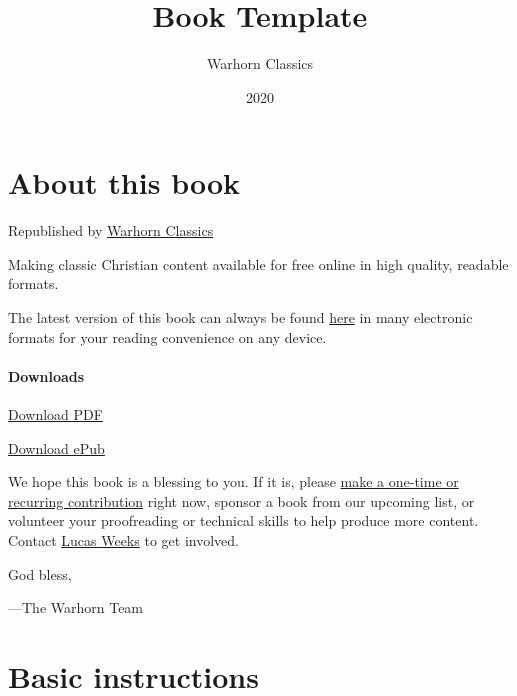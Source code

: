 \documentclass[
]{book}
\title{Book Template}
\author{Warhorn Classics}
\date{2020}
\begin{document}
\maketitle

\mainmatter
{}

{
\setcounter{tocdepth}{1}
\tableofcontents
}
\hypertarget{about-this-book}{%
\chapter*{About this book}\label{about-this-book}}

Republished by \href{https://classics.warhornmedia.com/}{Warhorn Classics}

Making classic Christian content available for free online in high quality, readable formats.

The latest version of this book can always be found \href{https://warhornmedia.github.io/warhorn-classics-book-template/}{here} in many electronic formats for your reading convenience on any device.

\hypertarget{downloads}{%
\subsubsection*{Downloads}\label{downloads}}

\href{https://warhornmedia.github.io/warhorn-classics-book-template//Warhorn-Classics_Book_Template.pdf}{Download PDF}

\href{https://warhornmedia.github.io/warhorn-classics-book-template//Warhorn-Classics_Book_Template.epub}{Download ePub}

We hope this book is a blessing to you. If it is, please \href{https://warhornmedia.com/give}{make a one-time or recurring contribution} right now, sponsor a book from our upcoming list, or volunteer your proofreading or technical skills to help produce more content. Contact \href{mailto:lucas@beggarsborn.com}{Lucas Weeks} to get involved.

God bless,

---The Warhorn Team

\clearpage
\setcounter{page}{1}

\hypertarget{basic-instructions}{%
\chapter{Basic instructions}\label{basic-instructions}}
\end{document}
